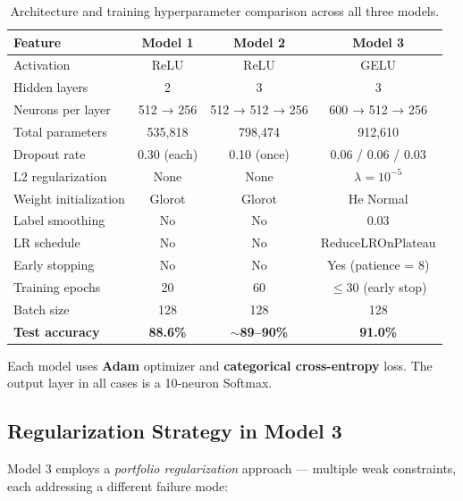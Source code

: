 \documentclass[12pt,letterpaper]{article}
\begin{document}
\begin{table}[H]
\centering
\caption{Architecture and training hyperparameter comparison across all three models.}
\label{tab:model_comparison}
\begin{tabular}{lccc}
\toprule
\textbf{Feature} & \textbf{Model 1} & \textbf{Model 2} & \textbf{Model 3} \\
\midrule
Activation & ReLU & ReLU & GELU \\
Hidden layers & 2 & 3 & 3 \\
Neurons per layer & 512 → 256 & 512 → 512 → 256 & 600 → 512 → 256 \\
Total parameters & 535,818 & 798,474 & 912,610 \\
Dropout rate & 0.30 (each) & 0.10 (once) & 0.06 / 0.06 / 0.03 \\
L2 regularization & None & None & $\lambda = 10^{-5}$ \\
Weight initialization & Glorot & Glorot & He Normal \\
Label smoothing & No & No & 0.03 \\
LR schedule & No & No & ReduceLROnPlateau \\
Early stopping & No & No & Yes (patience = 8) \\
Training epochs & 20 & 60 & $\leq 30$ (early stop) \\
Batch size & 128 & 128 & 128 \\
\textbf{Test accuracy} & \textbf{88.6\%} & \textbf{$\sim$89--90\%} & \textbf{91.0\%} \\
\bottomrule
\end{tabular}
\end{table}

Each model uses \textbf{Adam} optimizer \citep{kingma2014adam} and \textbf{categorical cross-entropy} loss. The output layer in all cases is a 10-neuron Softmax.

\subsection{Regularization Strategy in Model 3}

Model 3 employs a \emph{portfolio regularization} approach — multiple weak constraints, each addressing a different failure mode:
\end{document}
